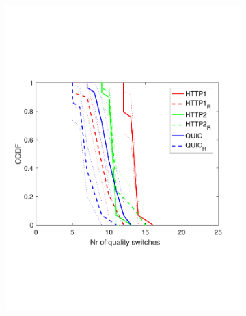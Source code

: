 \begin{figure}[t!]
\begin{subfigure}[t]{0.33\textwidth}
    \includegraphics[trim={0 5cm 0 6cm}, scale=0.24]{figures/CDF_cntswitch_squad_udpstair_nd18.pdf}
    \caption{}
    \label{fig:udpstaircntsw}
  \end{subfigure}
  \begin{subfigure}[t]{0.33\textwidth}
  \captionsetup{justification=centering,margin=1.5cm}

\end{subfigure}
\end{figure}
